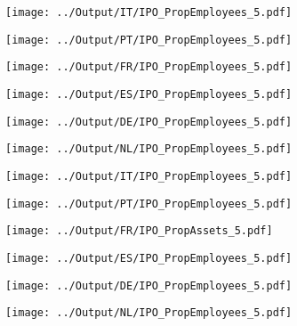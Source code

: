 \documentclass[12pt,notitlepage]{article}
\begin{document}
\begin{figure}[!htpb]
\centering
\caption{Employment Growth Over IPOs}
\begin{subfigure}{.49\textwidth}
    \centering
 \texttt{[image: ../Output/IT/IPO\_PropEmployees\_5.pdf]}
\end{subfigure}%
\begin{subfigure}{.49\textwidth}
    \centering
 \texttt{[image: ../Output/PT/IPO\_PropEmployees\_5.pdf]}
\end{subfigure}
\begin{subfigure}{.49\textwidth}
    \centering
 \texttt{[image: ../Output/FR/IPO\_PropEmployees\_5.pdf]}
\end{subfigure}%
\begin{subfigure}{.49\textwidth}
    \centering
 \texttt{[image: ../Output/ES/IPO\_PropEmployees\_5.pdf]}
\end{subfigure}
\begin{subfigure}{.49\textwidth}
    \centering
 \texttt{[image: ../Output/DE/IPO\_PropEmployees\_5.pdf]}
\end{subfigure}
\begin{subfigure}{.49\textwidth}
    \centering
 \texttt{[image: ../Output/NL/IPO\_PropEmployees\_5.pdf]}
\end{subfigure}
\end{figure}



\FloatBarrier
\begin{figure}[!htpb]
\centering
\caption{Asset Growth Over IPOs}
\begin{subfigure}{.49\textwidth}
    \centering
 \texttt{[image: ../Output/IT/IPO\_PropEmployees\_5.pdf]}
\end{subfigure}%
\begin{subfigure}{.49\textwidth}
    \centering
 \texttt{[image: ../Output/PT/IPO\_PropEmployees\_5.pdf]}
\end{subfigure}
\begin{subfigure}{.49\textwidth}
    \centering
 \texttt{[image: ../Output/FR/IPO\_PropAssets\_5.pdf]}
\end{subfigure}%
\begin{subfigure}{.49\textwidth}
    \centering
 \texttt{[image: ../Output/ES/IPO\_PropEmployees\_5.pdf]}
\end{subfigure}
\begin{subfigure}{.49\textwidth}
    \centering
 \texttt{[image: ../Output/DE/IPO\_PropEmployees\_5.pdf]}
\end{subfigure}
\begin{subfigure}{.49\textwidth}
    \centering
 \texttt{[image: ../Output/NL/IPO\_PropEmployees\_5.pdf]}
\end{subfigure}
\end{figure}
\end{document}
